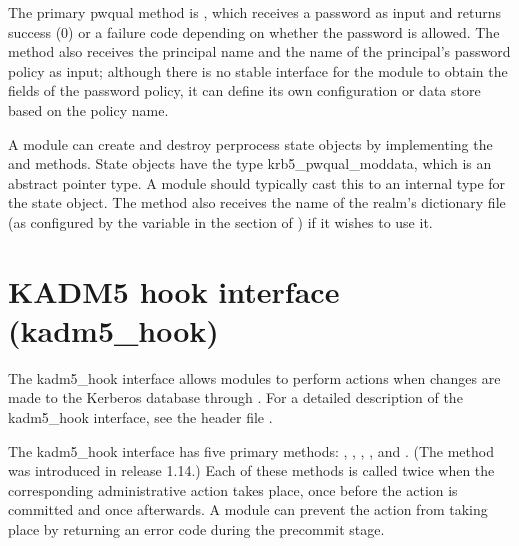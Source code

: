 \documentclass[letterpaper,10pt,english]{sphinxmanual}
\begin{document}
\sphinxAtStartPar
The primary pwqual method is , which receives a password as
input and returns success (0) or a  failure code
depending on whether the password is allowed.  The  method
also receives the principal name and the name of the principal’s
password policy as input; although there is no stable interface for
the module to obtain the fields of the password policy, it can define
its own configuration or data store based on the policy name.

\sphinxAtStartPar
A module can create and destroy per\sphinxhyphen{}process state objects by
implementing the  and  methods.  State objects have
the type krb5\_pwqual\_moddata, which is an abstract pointer type.  A
module should typically cast this to an internal type for the state
object.  The  method also receives the name of the realm’s
dictionary file (as configured by the  variable in the
 section of ) if it wishes to use
it.

\sphinxstepscope


\section{KADM5 hook interface (kadm5\_hook)}
\label{\detokenize{plugindev/kadm5_hook:kadm5-hook-interface-kadm5-hook}}\label{\detokenize{plugindev/kadm5_hook:kadm5-hook-plugin}}\label{\detokenize{plugindev/kadm5_hook::doc}}
\sphinxAtStartPar
The kadm5\_hook interface allows modules to perform actions when
changes are made to the Kerberos database through .
For a detailed description of the kadm5\_hook interface, see the header
file .

\sphinxAtStartPar
The kadm5\_hook interface has five primary methods: ,
, , , and .  (The 
method was introduced in release 1.14.)  Each of these methods is
called twice when the corresponding administrative action takes place,
once before the action is committed and once afterwards.  A module can
prevent the action from taking place by returning an error code during
the pre\sphinxhyphen{}commit stage.
\end{document}
